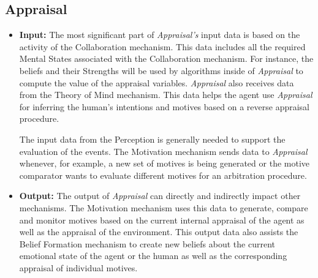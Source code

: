 \documentclass[letterpaper]{article}
\begin{document}
\subsection{Appraisal}

\begin{itemize}
  \item \textbf{Input:} The most significant part of \textit{Appraisal's} input
  data is based on the activity of the Collaboration mechanism. This data
  includes all the required Mental States associated with the Collaboration
  mechanism. For instance, the beliefs and their Strengths will be used by
  algorithms inside of \textit{Appraisal} to compute the value of the appraisal
  variables. \textit{Appraisal} also receives data from the Theory of Mind
  mechanism. This data helps the agent use \textit{Appraisal} for inferring
  the human's intentions and motives based on a reverse appraisal procedure.
  
  The input data from the Perception is generally needed to support the
  evaluation of the events. The Motivation mechanism sends data to
  \textit{Appraisal} whenever, for example, a new set of motives is being
  generated or the motive comparator wants to evaluate different motives for an
  arbitration procedure.
   
  \item \textbf{Output:} The output of \textit{Appraisal} can directly and
  indirectly impact other mechanisms. The Motivation mechanism uses this data to
  generate, compare and monitor motives based on the current internal appraisal
  of the agent as well as the appraisal of the environment. This output data
  also assists the Belief Formation mechanism to create new beliefs about the
  current emotional state of the agent or the human as well as the corresponding
  appraisal of individual motives.
  

\end{itemize}
\end{document}

